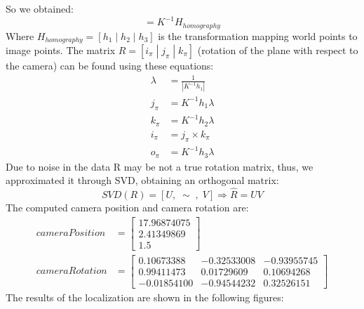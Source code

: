\documentclass[11pt, oneside]{article}
\begin{document}
So we obtained:
\begin{equation}
	[j_\pi | k_\pi | o_\pi]= K^{-1}H_{homography} 
\end{equation}
Where $H_{homography} = [h_1\; |\; h_2\; |\; h_3]$ is the transformation mapping world points to image points. The matrix $R=[i_\pi\; | \; j_\pi \; | \; k_\pi]$ (rotation of the plane with respect to the camera) can be found using these equations:
\begin{subequations}
	\begin{align*}
		\lambda &= \frac{1}{|K^{-1}h_1|} \\
		j_\pi &= K^{-1}h_1\lambda \\
		k_\pi &= K^{-1}h_2\lambda \\
		i_\pi &= j_\pi \times k_\pi  \\
		o_\pi &= K^{-1} h_3 \lambda
	\end{align*}
\end{subequations}
Due to noise in the data R may be not a true rotation matrix, thus, we approximated it through SVD, obtaining an orthogonal matrix:
\begin{equation}
	SVD(R) = [U,\; \sim\;,\;V] \Rightarrow \hat{R} = UV
\end{equation}
The computed camera position and camera rotation are:
\begin{subequations}
	\begin{align*}
	cameraPosition &=
	\begin{bmatrix}
		17.96874075 \\ 2.41349869 \\ 1.5
	\end{bmatrix}
	\\
	cameraRotation &= 
	\begin{bmatrix}
		0.10673388 & -0.32533008 & -0.93955745 \\
		0.99411473 & 0.01729609 & 0.10694268 \\
		-0.01854100 & -0.94544232 & 0.32526151
	\end{bmatrix}
	\end{align*}
\end{subequations} 
The results of the localization are shown in the following figures:
\end{document}
